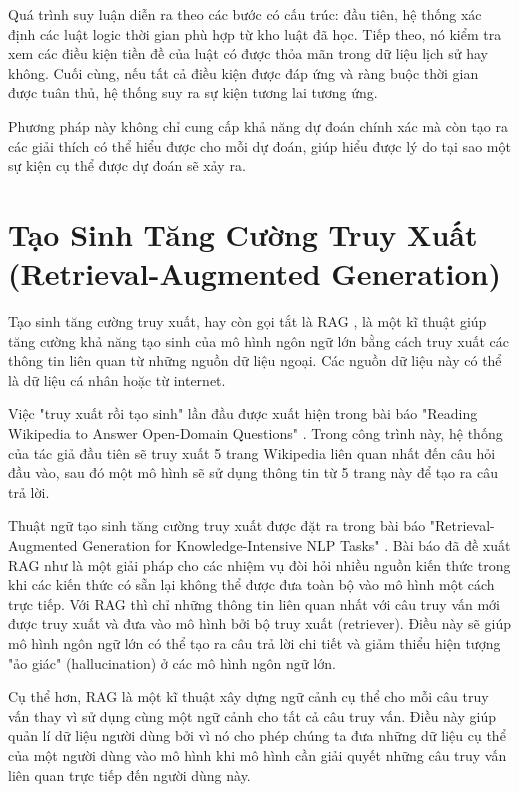 Quá trình suy luận diễn ra theo các bước có cấu trúc: đầu tiên, hệ thống xác định các luật logic thời gian phù hợp từ kho luật đã học. Tiếp theo, nó kiểm tra xem các điều kiện tiền đề của luật có được thỏa mãn trong dữ liệu lịch sử hay không. Cuối cùng, nếu tất cả điều kiện được đáp ứng và ràng buộc thời gian được tuân thủ, hệ thống suy ra sự kiện tương lai tương ứng.

Phương pháp này không chỉ cung cấp khả năng dự đoán chính xác mà còn tạo ra các giải thích có thể hiểu được cho mỗi dự đoán, giúp hiểu được lý do tại sao một sự kiện cụ thể được dự đoán sẽ xảy ra.


\section{Tạo Sinh Tăng Cường Truy Xuất (Retrieval-Augmented Generation)}

Tạo sinh tăng cường truy xuất, hay còn gọi tắt là RAG \cite{ref_article27}, là một kĩ thuật giúp tăng cường khả năng tạo sinh của mô hình ngôn ngữ lớn bằng cách truy xuất các thông tin liên quan từ những nguồn dữ liệu ngoại. Các nguồn dữ liệu này có thể là dữ liệu cá nhân hoặc từ internet.

Việc "truy xuất rồi tạo sinh" lần đầu được xuất hiện trong bài báo "Reading Wikipedia to Answer Open-Domain Questions" \cite{ref_article38}. Trong công trình này, hệ thống của tác giả đầu tiên sẽ truy xuất 5 trang Wikipedia liên quan nhất đến câu hỏi đầu vào, sau đó một mô hình sẽ sử dụng thông tin từ 5 trang này để tạo ra câu trả lời.

Thuật ngữ tạo sinh tăng cường truy xuất được đặt ra trong bài báo "Retrieval-Augmented Generation for Knowledge-Intensive NLP Tasks" \cite{ref_article27}. Bài báo đã đề xuất RAG như là một giải pháp cho các nhiệm vụ đòi hỏi nhiều nguồn kiến thức trong khi các kiến thức có sẵn lại không thể được đưa toàn bộ vào mô hình một cách trực tiếp. Với RAG thì chỉ những thông tin liên quan nhất với câu truy vấn  mới được truy xuất và đưa vào mô hình bởi bộ truy xuất (retriever). Điều này sẽ giúp mô hình ngôn ngữ lớn có thể tạo ra câu trả lời chi tiết và giảm thiểu hiện tượng "ảo giác" (hallucination) \cite{ref_article39} ở các mô hình ngôn ngữ lớn.

Cụ thể hơn, RAG là một kĩ thuật xây dựng ngữ cảnh cụ thể cho mỗi câu truy vấn thay vì sử dụng cùng một ngữ cảnh cho tất cả câu truy vấn. Điều này giúp quản lí dữ liệu người dùng bởi vì nó cho phép chúng ta đưa những dữ liệu cụ thể của một người dùng vào mô hình khi mô hình cần giải quyết những câu truy vấn liên quan trực tiếp đến người dùng này.

